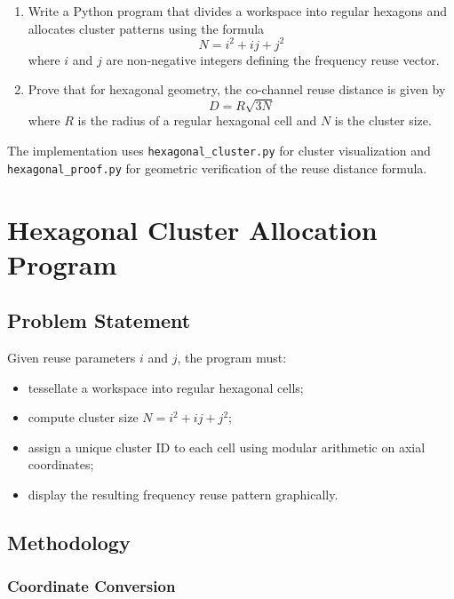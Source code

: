 \documentclass[12pt,a4paper]{report}
\begin{document}
\begin{enumerate}[label=\arabic*.]
    \item Write a Python program that divides a workspace into regular hexagons and allocates cluster patterns using the formula
    \begin{equation}
        N = i^2 + ij + j^2
    \end{equation}
    where $i$ and $j$ are non-negative integers defining the frequency reuse vector.

    \item Prove that for hexagonal geometry, the co-channel reuse distance is given by
    \begin{equation}
        D = R\sqrt{3N}
    \end{equation}
    where $R$ is the radius of a regular hexagonal cell and $N$ is the cluster size.
\end{enumerate}

The implementation uses \texttt{hexagonal\_cluster.py} for cluster visualization and \texttt{hexagonal\_proof.py} for geometric verification of the reuse distance formula.

\chapter{Hexagonal Cluster Allocation Program}

\section{Problem Statement}

Given reuse parameters $i$ and $j$, the program must:
\begin{itemize}
    \item tessellate a workspace into regular hexagonal cells;
    \item compute cluster size $N = i^2 + ij + j^2$;
    \item assign a unique cluster ID to each cell using modular arithmetic on axial coordinates;
    \item display the resulting frequency reuse pattern graphically.
\end{itemize}

\section{Methodology}

\subsection{Coordinate Conversion}
\end{document}
